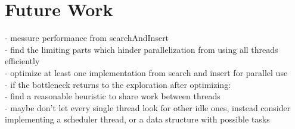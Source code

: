 \chapter{Future Work}
- messure performance from searchAndInsert\\
- find the limiting parts which hinder parallelization from using all threads efficiently\\
- optimize at least one implementation from search and insert for parallel use\\
- if the bottleneck returns to the exploration after optimizing:\\
- find a reasonable heuristic to share work between threads\\
- maybe don't let every single thread look for other idle ones, instead consider implementing a scheduler thread, or a data structure with possible tasks\\